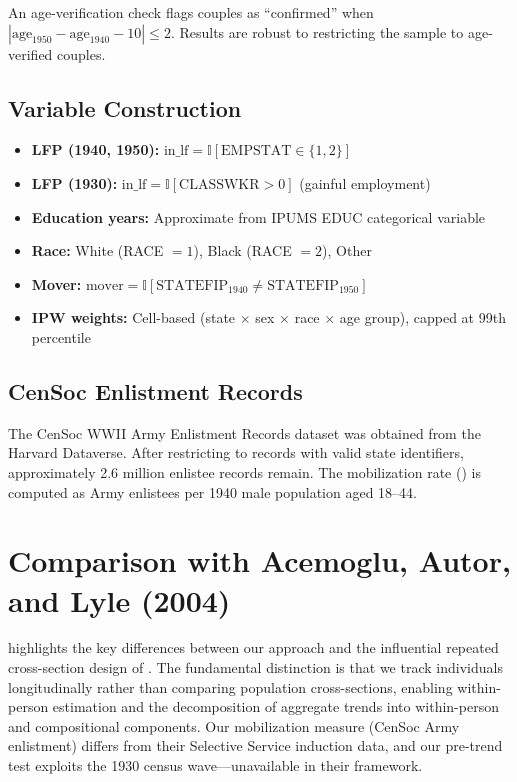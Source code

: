 \documentclass[12pt]{article}
\newcommand{\ind}{\mathbb{I}}
\begin{document}
An age-verification check flags couples as ``confirmed'' when $|\text{age}_{1950} - \text{age}_{1940} - 10| \leq 2$. Results are robust to restricting the sample to age-verified couples.

\subsection{Variable Construction}

\begin{itemize}
\item \textbf{LFP (1940, 1950):} $\text{in\_lf} = \ind[\text{EMPSTAT} \in \{1,2\}]$
\item \textbf{LFP (1930):} $\text{in\_lf} = \ind[\text{CLASSWKR} > 0]$ (gainful employment)
\item \textbf{Education years:} Approximate from IPUMS EDUC categorical variable
\item \textbf{Race:} White (RACE $= 1$), Black (RACE $= 2$), Other
\item \textbf{Mover:} $\text{mover} = \ind[\text{STATEFIP}_{1940} \neq \text{STATEFIP}_{1950}]$
\item \textbf{IPW weights:} Cell-based (state $\times$ sex $\times$ race $\times$ age group), capped at 99th percentile
\end{itemize}

\subsection{CenSoc Enlistment Records}

The CenSoc WWII Army Enlistment Records dataset \citep{cenSoc2024} was obtained from the Harvard Dataverse. After restricting to records with valid state identifiers, approximately 2.6 million enlistee records remain. The mobilization rate () is computed as Army enlistees per 1940 male population aged 18--44.


\section{Comparison with Acemoglu, Autor, and Lyle (2004)}
\label{app:comparison}

 highlights the key differences between our approach and the influential repeated cross-section design of \citet{acemoglu2004women}. The fundamental distinction is that we track individuals longitudinally rather than comparing population cross-sections, enabling within-person estimation and the decomposition of aggregate trends into within-person and compositional components. Our mobilization measure (CenSoc Army enlistment) differs from their Selective Service induction data, and our pre-trend test exploits the 1930 census wave---unavailable in their framework.
\end{document}

